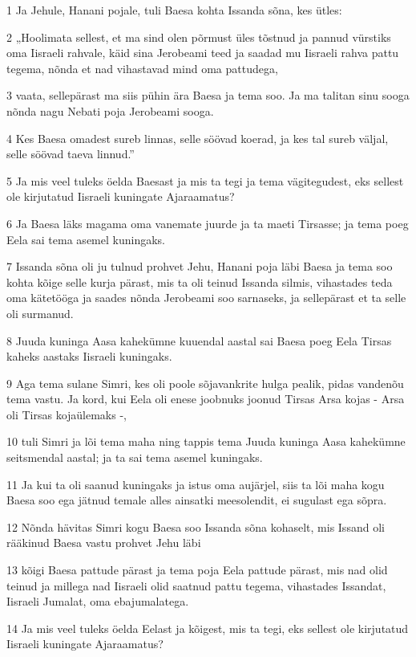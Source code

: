 \par 1 Ja Jehule, Hanani pojale, tuli Baesa kohta Issanda sõna, kes ütles:
\par 2 „Hoolimata sellest, et ma sind olen põrmust üles tõstnud ja pannud vürstiks oma Iisraeli rahvale, käid sina Jerobeami teed ja saadad mu Iisraeli rahva pattu tegema, nõnda et nad vihastavad mind oma pattudega,
\par 3 vaata, sellepärast ma siis pühin ära Baesa ja tema soo. Ja ma talitan sinu sooga nõnda nagu Nebati poja Jerobeami sooga.
\par 4 Kes Baesa omadest sureb linnas, selle söövad koerad, ja kes tal sureb väljal, selle söövad taeva linnud.”
\par 5 Ja mis veel tuleks öelda Baesast ja mis ta tegi ja tema vägitegudest, eks sellest ole kirjutatud Iisraeli kuningate Ajaraamatus?
\par 6 Ja Baesa läks magama oma vanemate juurde ja ta maeti Tirsasse; ja tema poeg Eela sai tema asemel kuningaks.
\par 7 Issanda sõna oli ju tulnud prohvet Jehu, Hanani poja läbi Baesa ja tema soo kohta kõige selle kurja pärast, mis ta oli teinud Issanda silmis, vihastades teda oma kätetööga ja saades nõnda Jerobeami soo sarnaseks, ja sellepärast et ta selle oli surmanud.
\par 8 Juuda kuninga Aasa kahekümne kuuendal aastal sai Baesa poeg Eela Tirsas kaheks aastaks Iisraeli kuningaks.
\par 9 Aga tema sulane Simri, kes oli poole sõjavankrite hulga pealik, pidas vandenõu tema vastu. Ja kord, kui Eela oli enese joobnuks joonud Tirsas Arsa kojas - Arsa oli Tirsas kojaülemaks -,
\par 10 tuli Simri ja lõi tema maha ning tappis tema Juuda kuninga Aasa kahekümne seitsmendal aastal; ja ta sai tema asemel kuningaks.
\par 11 Ja kui ta oli saanud kuningaks ja istus oma aujärjel, siis ta lõi maha kogu Baesa soo ega jätnud temale alles ainsatki meesolendit, ei sugulast ega sõpra.
\par 12 Nõnda hävitas Simri kogu Baesa soo Issanda sõna kohaselt, mis Issand oli rääkinud Baesa vastu prohvet Jehu läbi
\par 13 kõigi Baesa pattude pärast ja tema poja Eela pattude pärast, mis nad olid teinud ja millega nad Iisraeli olid saatnud pattu tegema, vihastades Issandat, Iisraeli Jumalat, oma ebajumalatega.
\par 14 Ja mis veel tuleks öelda Eelast ja kõigest, mis ta tegi, eks sellest ole kirjutatud Iisraeli kuningate Ajaraamatus?
